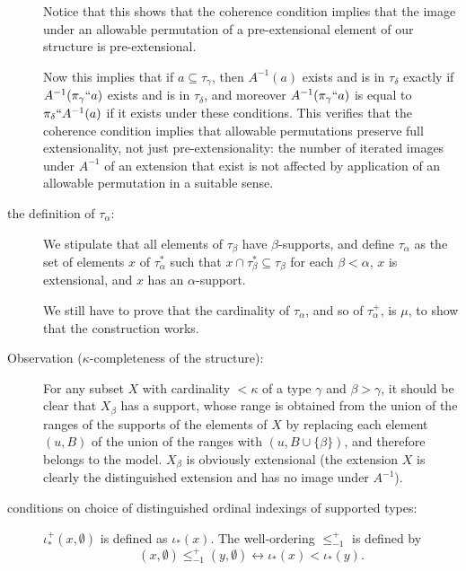\documentclass[112pt]{article}
\begin{document}
\begin{description}
Notice that this shows that the coherence condition implies that the image under an allowable permutation of a pre-extensional element of our structure is pre-extensional.

Now this implies that if $a \subseteq \tau_\gamma$, then $A^{-1}(a)$ exists and is in $\tau_\delta$ exactly if $A^{-1}(\pi_\gamma``a)$ exists and is in $\tau_\delta$, and moreover $A^{-1}(\pi_\gamma``a)$ is equal to $\pi_\delta``A^{-1}(a)$ if it exists under these conditions.  This verifies that the coherence condition implies that allowable permutations preserve full extensionality, not just pre-extensionality:  the number of iterated images under $A^{-1}$ of an extension that exist is not affected by application of an allowable permutation in a suitable sense.



\item[the definition of $\tau_\alpha$:]  We stipulate that all elements of $\tau_\beta$ have $\beta$-supports, and define $\tau_\alpha$ as the set of elements $x$ of $\tau^*_\alpha$ such that
$x \cap \tau^*_{\beta} \subseteq \tau_\beta$ for each $\beta<\alpha$, $x$ is extensional, and $x$ has an $\alpha$-support.

We still have to prove that the cardinality of $\tau_\alpha$, and so of $\tau^+_\alpha$, is $\mu$, to show that the construction works.

\item[Observation ($\kappa$-completeness of the structure):]  For any subset $X$ with cardinality $<\kappa$ of a type $\gamma$ and $\beta>\gamma$, it should be clear that $X_\beta$ has a support, whose range is obtained from the union of the ranges of the supports of the elements of $X$  by replacing each element $(u,B)$ of the union of the ranges  with $(u,B \cup \{\beta\})$, and therefore belongs to the model.  $X_\beta$ is obviously extensional (the extension $X$ is clearly the distinguished extension and has no image under $A^{-1}$).

\item[conditions on choice of distinguished ordinal indexings of supported types:]  

$\iota_*^+(x,\emptyset)$ is defined as $\iota_*(x)$.
The well-ordering $\leq_{-1}^+$ is defined by $$(x,\emptyset) \leq_{-1}^+ (y,\emptyset) \leftrightarrow \iota_*(x) < \iota_*(y).$$

\begin{comment}

The well-ordering $\leq_\alpha^+$ of $\tau_\alpha^+$ ($\alpha \in \lambda$) must satisfy the condition that for each $(x,S) \in \tau_\alpha^+$, for each $(z,A) \in {\tt rng}(S)$ and litter $L = f_{\beta,\gamma}(y,T)$ with $\beta<\alpha$,  where $L$  meets $z$, $\iota_*^+(y,T) < \iota_*^+(x,S)$ must hold.


\end{comment}
\end{description}
\end{document}
